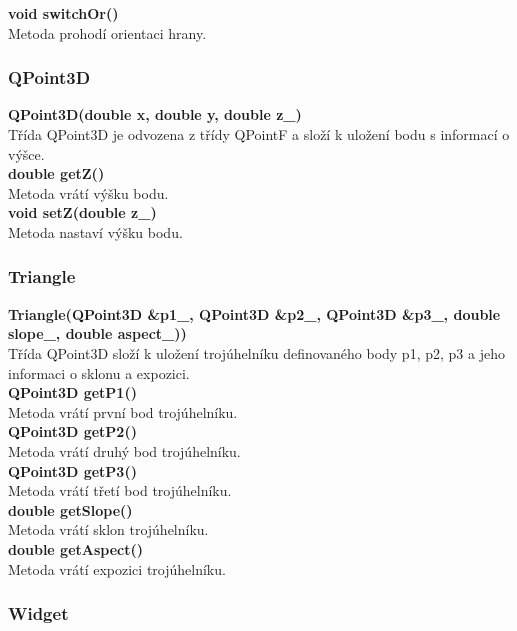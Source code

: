 \documentclass[a4paper, 12pt]{article}
\begin{document}
\textbf{void switchOr()}\\
Metoda prohodí orientaci hrany.\\

\subsubsection{QPoint3D}
\textbf{QPoint3D(double x, double y, double z\_)}\\
Třída QPoint3D je odvozena z třídy QPointF a složí k uložení bodu s informací o výšce.\\

\textbf{double getZ()}\\
Metoda vrátí výšku bodu.\\

\textbf{void setZ(double z\_)}\\
Metoda nastaví výšku bodu.\\

\subsubsection{Triangle}
\textbf{Triangle(QPoint3D \&p1\_, QPoint3D \&p2\_, QPoint3D \&p3\_, double slope\_, double aspect\_))}\\
Třída QPoint3D složí k uložení trojúhelníku definovaného body p1, p2, p3 a jeho informaci o sklonu a expozici.\\

\textbf{ QPoint3D getP1()}\\
Metoda vrátí první bod trojúhelníku.\\

\textbf{ QPoint3D getP2()}\\
Metoda vrátí druhý bod trojúhelníku.\\

\textbf{ QPoint3D getP3()}\\
Metoda vrátí třetí bod trojúhelníku.\\

\textbf{double getSlope()}\\
Metoda vrátí sklon trojúhelníku.\\

\textbf{double getAspect()}\\
Metoda vrátí expozici trojúhelníku.\\

\subsubsection{Widget}
\end{document}
